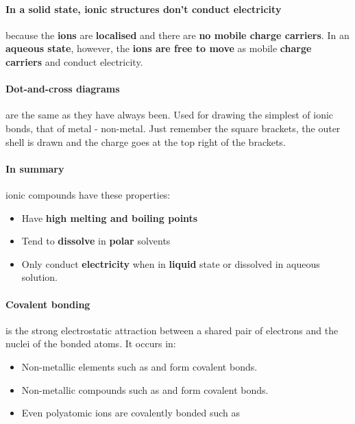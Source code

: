     \paragraph{ In a solid state, ionic structures don't conduct electricity} because the \textbf{ions} are \textbf{localised} and there are \textbf{no mobile charge carriers}.
    In an \textbf{aqueous state}, however, the \textbf{ions are free to move} as mobile \textbf{charge carriers} and conduct electricity.
   \paragraph{Dot-and-cross diagrams} are the same as they have always been.
	Used for drawing the simplest of ionic bonds, that of metal - non-metal.
	Just remember the square brackets, the outer shell is drawn and the charge goes at the top right of the brackets.
  \pagebreak
  \paragraph{In summary} ionic compounds have these properties:
    \begin{itemize}
		\item Have \textbf{high melting and boiling points}
		\item Tend to \textbf{dissolve} in \textbf{polar} solvents
		\item Only conduct \textbf{electricity} when in \textbf{liquid} state or dissolved in aqueous solution.
	\end{itemize}
 
    \paragraph{Covalent bonding} is the strong electrostatic attraction between a shared pair of electrons and the nuclei of the bonded atoms. It occurs in:
    \begin{itemize}
	 	\item Non-metallic elements such as  and  form covalent bonds.
	 	\item Non-metallic compounds such as  and  form covalent bonds.
	 	\item Even polyatomic ions are covalently bonded such as 
	\end{itemize}
